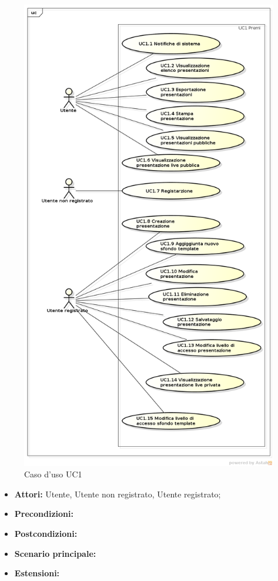 \begin{figure}[h]
	\begin{center}
	\includegraphics[scale=0.3]{diagram/UC1.png}
	\caption{Caso d'uso UC1}
	\end{center}
\end{figure}

\begin{itemize}
	\item \textbf{Attori:} Utente, Utente non registrato, Utente registrato; 
	\item \textbf{Precondizioni:}
	\item \textbf{Postcondizioni:}
	\item \textbf{Scenario principale:}
	\item \textbf{Estensioni:}
\end{itemize}


